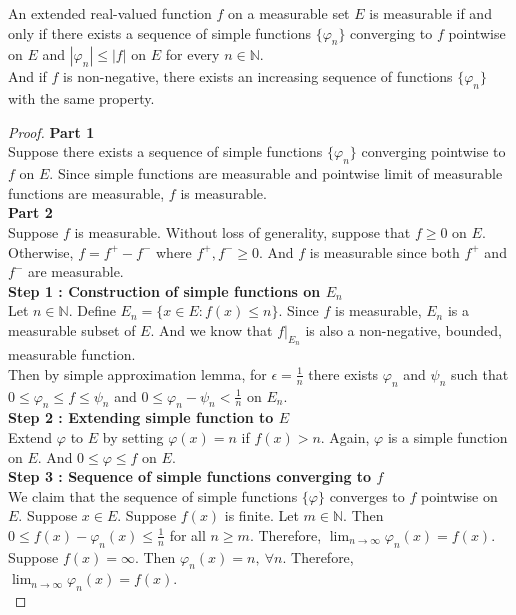\begin{theorem}
	An extended real-valued function $f$ on a measurable set $E$ is measurable if and only if there exists a sequence of simple functions $\{ \varphi_n \}$ converging to $f$ pointwise on $E$ and $|\varphi_n| \le |f|$ on $E$ for every $n \in \mathbb{N}$.\\
	And if $f$ is non-negative, there exists an increasing sequence of functions $\{ \varphi_n \}$ with the same property.
\end{theorem}
\begin{proof}
	\textbf{Part 1}\\
	Suppose there exists a sequence of simple functions $\{\varphi_n \}$ converging pointwise to $f$ on $E$.
	Since simple functions are measurable and pointwise limit of measurable functions are measurable, $f$ is measurable.\\

	\textbf{Part 2}\\	
	Suppose $f$ is measurable.
	Without loss of generality, suppose that $f \ge 0$ on $E$.
	Otherwise, $f = f^+ - f^-$ where $f^+,f^- \ge 0$.
	And $f$ is measurable since both $f^+$ and $f^-$ are measurable.\\

	\textbf{Step 1 : Construction of simple functions on $E_n$}\\
	Let $n \in \mathbb{N}$.
	Define $E_n = \{ x \in E : f(x) \le n \}$.
	Since $f$ is measurable, $E_n$ is a measurable subset of $E$.
	And we know that $f|_{E_n}$ is also a non-negative, bounded, measurable function.\\

	Then by simple approximation lemma, for $\epsilon = \frac{1}{n}$ there exists $\varphi_n$ and $\psi_n$ such that $0 \le \varphi_n \le f \le \psi_n$ and $0 \le \varphi_n - \psi_n < \frac{1}{n}$ on $E_n$.\\

	\textbf{Step 2 : Extending simple function to $E$}\\
	Extend $\varphi$ to $E$ by setting $\varphi(x) = n$ if $f(x) > n$.
	Again, $\varphi$ is a simple function on $E$.
	And $0 \le \varphi \le f$ on $E$.\\

	\textbf{Step 3 : Sequence of simple functions converging to $f$}\\
	We claim that the sequence of simple functions $\{ \varphi \}$ converges to $f$ pointwise on $E$.
	Suppose $x \in E$.
	Suppose $f(x)$ is finite.
	Let $m \in \mathbb{N}$.
	Then $0 \le f(x) - \varphi_n(x) \le \frac{1}{n}$ for all $n \ge m$.
	Therefore, $\displaystyle \lim_{n \to \infty} \varphi_n(x) = f(x)$.
	Suppose $f(x) = \infty$.
	Then $\varphi_n(x) = n,\ \forall n$.
	Therefore, $\displaystyle \lim_{n \to \infty} \varphi_n(x) = f(x)$.\\


\end{proof}
